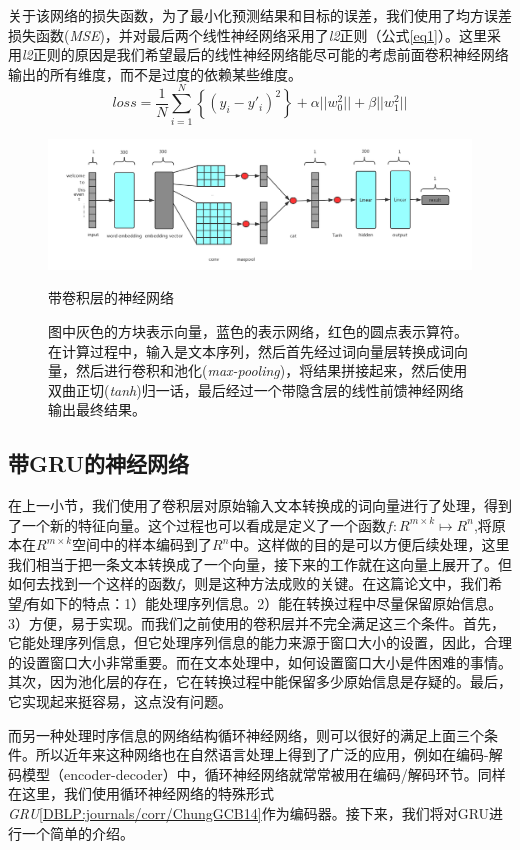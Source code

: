 \documentclass[12pt]{template}
\begin{document}
关于该网络的损失函数，为了最小化预测结果和目标的误差，我们使用了均方误差损失函数(\textit{MSE})，并对最后两个线性神经网络采用了\textit{l2}正则（公式\ref{eq1}）。这里采用\textit{l2}正则的原因是我们希望最后的线性神经网络能尽可能的考虑前面卷积神经网络输出的所有维度，而不是过度的依赖某些维度。
\begin{equation}\label{eq1}
loss=\frac{1}{N}\displaystyle\sum_{i=1}^{N}\left\{(y_i-y'_i)^2\right\}+\alpha||w_0^2||+\beta||w_1^2||
\end{equation}
\begin{figure}[htbp]
    \centering
    \includegraphics[width=16cm]{conv_ranker.png}
    \caption{带卷积层的神经网络}
    \captionsetup{font=footnotesize,margin=30pt}\caption*{图中灰色的方块表示向量，蓝色的表示网络，红色的圆点表示算符。在计算过程中，输入是文本序列，然后首先经过词向量层转换成词向量，然后进行卷积和池化(\textit{max-pooling})，将结果拼接起来，然后使用双曲正切(\textit{tanh})归一话，最后经过一个带隐含层的线性前馈神经网络输出最终结果。}
    \label{f21}
\end{figure} 

\subsection{带GRU的神经网络}
在上一小节，我们使用了卷积层对原始输入文本转换成的词向量进行了处理，得到了一个新的特征向量。这个过程也可以看成是定义了一个函数\(f:R^{m\times k}\mapsto R^n\),将原本在\(R^{m\times k}\)空间中的样本编码到了\(R^n\)中。这样做的目的是可以方便后续处理，这里我们相当于把一条文本转换成了一个向量，接下来的工作就在这向量上展开了。但如何去找到一个这样的函数\textit{f}，则是这种方法成败的关键。在这篇论文中，我们希望\textit{f}有如下的特点：1）能处理序列信息。2）能在转换过程中尽量保留原始信息。3）方便，易于实现。而我们之前使用的卷积层并不完全满足这三个条件。首先，它能处理序列信息，但它处理序列信息的能力来源于窗口大小的设置，因此，合理的设置窗口大小非常重要。而在文本处理中，如何设置窗口大小是件困难的事情。其次，因为池化层的存在，它在转换过程中能保留多少原始信息是存疑的。最后，它实现起来挺容易，这点没有问题。

而另一种处理时序信息的网络结构循环神经网络，则可以很好的满足上面三个条件。所以近年来这种网络也在自然语言处理上得到了广泛的应用，例如在编码-解码模型（encoder-decoder）中，循环神经网络就常常被用在编码/解码环节。同样在这里，我们使用循环神经网络的特殊形式\textit{GRU}\ref{DBLP:journals/corr/ChungGCB14}作为编码器。接下来，我们将对GRU进行一个简单的介绍。
\end{document}
